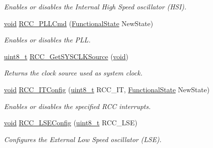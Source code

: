 \begin{DoxyCompactItemize}
\begin{DoxyCompactList}\small\item\em Enables or disables the Internal High Speed oscillator (H\+SI). \end{DoxyCompactList}\item 
\hyperlink{usb__devapi_8h_afabf60e7f57651d6d595a02c75f07cd0}{void} \hyperlink{group___r_c_c___exported___functions_ga84dee53c75e58fdb53571716593c2272}{R\+C\+C\+\_\+\+P\+L\+L\+Cmd} (\hyperlink{agilefox_2library_2inc_2stm32f10x__type_8h_ac9a7e9a35d2513ec15c3b537aaa4fba1}{Functional\+State} New\+State)
\begin{DoxyCompactList}\small\item\em Enables or disables the P\+LL. \end{DoxyCompactList}\item 
\hyperlink{_p_e___types_8h_aba7bc1797add20fe3efdf37ced1182c5}{uint8\+\_\+t} \hyperlink{group___r_c_c___exported___functions_gaaeb32311c208b2a980841c9c884a41ea}{R\+C\+C\+\_\+\+Get\+S\+Y\+S\+C\+L\+K\+Source} (\hyperlink{usb__devapi_8h_afabf60e7f57651d6d595a02c75f07cd0}{void})
\begin{DoxyCompactList}\small\item\em Returns the clock source used as system clock. \end{DoxyCompactList}\item 
\hyperlink{usb__devapi_8h_afabf60e7f57651d6d595a02c75f07cd0}{void} \hyperlink{group___r_c_c___exported___functions_gaa953aa226e9ce45300d535941e4dfe2f}{R\+C\+C\+\_\+\+I\+T\+Config} (\hyperlink{_p_e___types_8h_aba7bc1797add20fe3efdf37ced1182c5}{uint8\+\_\+t} R\+C\+C\+\_\+\+IT, \hyperlink{agilefox_2library_2inc_2stm32f10x__type_8h_ac9a7e9a35d2513ec15c3b537aaa4fba1}{Functional\+State} New\+State)
\begin{DoxyCompactList}\small\item\em Enables or disables the specified R\+CC interrupts. \end{DoxyCompactList}\item 
\hyperlink{usb__devapi_8h_afabf60e7f57651d6d595a02c75f07cd0}{void} \hyperlink{group___r_c_c___exported___functions_ga65209ab5c3589b249c7d70f978735ca6}{R\+C\+C\+\_\+\+L\+S\+E\+Config} (\hyperlink{_p_e___types_8h_aba7bc1797add20fe3efdf37ced1182c5}{uint8\+\_\+t} R\+C\+C\+\_\+\+L\+SE)
\begin{DoxyCompactList}\small\item\em Configures the External Low Speed oscillator (L\+SE). \end{DoxyCompactList}\item 

\end{DoxyCompactItemize}
